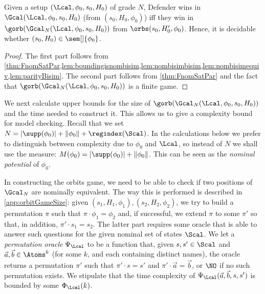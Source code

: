 \begin{corollary}\label{cor:winningNom}
Given a setup $(\Lcal,\phi_0,s_0,H_0)$ of grade $N$, Defender wins in $\Gcal(\Lcal,\phi_0,s_0,H_0)$ (from $(s_0,H_0,\phi_0)$) iff they win in $\gorb(\Gcal_N(\Lcal,\phi_0,s_0,H_0))$ from $\orbs(s_0,H_0',\phi_0)$. Hence, it is decidable whether $(s_0,H_0)\in\sem[]{\phi_0}$.
\end{corollary}
\begin{proof}
The first part follows from \cref{thm:FnomSatPar,lem:boundingisnombisim,lem:nombisimbisim,lem:nombisimequiv,lem:parityBisim}. The second part follows from \cref{thm:FnomSatPar} and the fact that 
$\gorb(\Gcal_N(\Lcal,\phi_0,s_0,H_0))$ is a finite game.
\end{proof}

We next calculate upper bounds for the size of $\gorb(\Gcal_N(\Lcal,\phi_0,s_0,H_0))$ and the time needed to construct it. This allows us to give a complexity bound for model checking.
Recall that we set $N=|\supp(\phi_0)|+\|\phi_0\|+\regindex(\Scal)$. In the calculations below we prefer to distinguish between complexity due to $\phi_0$ and $\Lcal$, so instead of $N$ we shall use the measure: $M(\phi_0)=|\supp(\phi_0)|+\|\phi_0\|$. This can be seen as the \emph{nominal potential} of $\phi_0$.%

In constructing the orbits game, we need to be able to check if two positions of $\Gcal_N$ are nominally equivalent. The way this is performed is described in \cref{app:orbitGameSize}: given $(s_1,H_1,\phi_1),(s_2,H_2,\phi_2)$, we try to build a permutation $\pi$ such that $\pi\cdot\phi_1=\phi_2$ and, if successful, we extend $\pi$ to some $\pi'$ so that, in addition, $\pi'\cdot s_1=s_2$. The latter part requires some oracle that is able to answer such questions for the given nominal set of states $\Scal$.
%
We let a \emph{permutation oracle} $\Psi_\Lcal$ to be a function that,
given  $s, s' \in \Scal$
	 and  $\vec a, \vec b \in \Atoms^k$ (for some $k$, and each containing distinct names), the oracle returns 
	a permutation $\pi'$ such that $\pi' \cdot s =s'$ and $\pi'\cdot \vec a = \vec b$,
	or $\NO$ if no such permutation exists. 
	We stipulate that the time complexity of $\Psi_\Lcal(\vec a, \vec b, s, s')$ is bounded by some $\Phi_\Lcal(k)$.



